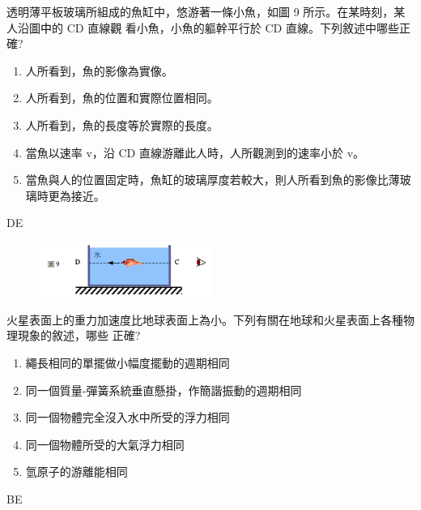 \documentclass[cn,10pt,math=newtx,chinesefont=founder]{elegantbook}
\begin{document}
\begin{example}
    透明薄平板玻璃所組成的魚缸中，悠游著一條小魚，如圖 9 所示。在某時刻，某人沿圖㆗的 CD 直線觀
看小魚，小魚的軀幹平行於 CD 直線。下列敘述中哪些正確? 
\begin{enumerate}[label=(\Alph*)]
    \item 人所看到，魚的影像為實像。
    \item 人所看到，魚的位置和實際位置相同。
    \item 人所看到，魚的長度等於實際的長度。
    \item 當魚以速率 v，沿 CD 直線游離此人時，人所觀測到的速率小於 v。
    \item 當魚與人的位置固定時，魚缸的玻璃厚度若較大，則人所看到魚的影像比薄玻璃時更為接近。
\end{enumerate}
\rightline{[93指考]}
\end{example}
\begin{solution}
    DE
\end{solution}
\begin{figure}[htbp]
    \flushright
    \includegraphics[width=0.5\textwidth]{image/93_13.png}
\end{figure}
\newpage
\begin{example}
    火星表面上的重力加速度比地球表面上為小。下列有關在地球和火星表面上各種物理現象的敘述，哪些
    正確? 
\begin{enumerate}[label=(\Alph*)]
    \item 繩長相同的單擺做小幅度擺動的週期相同
    \item 同一個質量-彈簧系統垂直懸掛，作簡諧振動的週期相同
    \item 同一個物體完全沒入水中所受的浮力相同
    \item 同一個物體所受的大氣浮力相同
    \item 氫原子的游離能相同
\end{enumerate}
\rightline{[93指考]}
\end{example}
\begin{solution}
    BE
\end{solution}
\newpage
\end{document}
